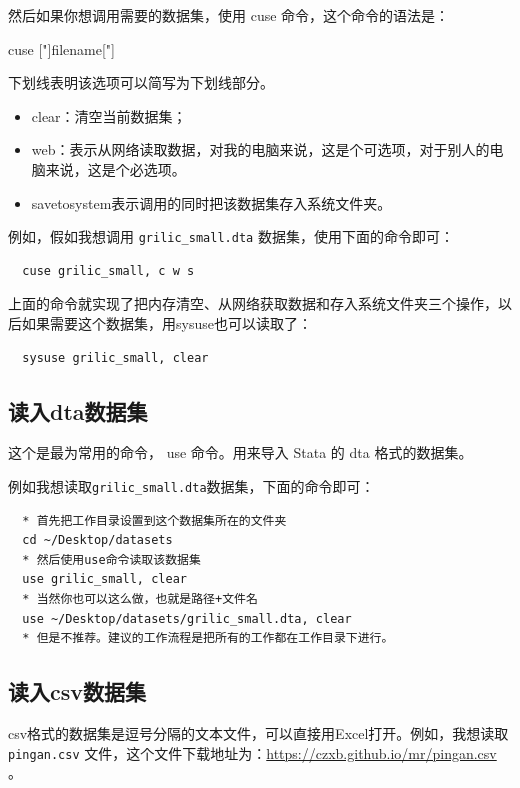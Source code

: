 \documentclass[cn,fancy,blue,11pt]{elegantbook}
\begin{document}
然后如果你想调用需要的数据集，使用 cuse 命令，这个命令的语法是：

\begin{stsyntax}
  \centering
  cuse
  ["]filename["]\
\end{stsyntax}

下划线表明该选项可以简写为下划线部分。

\begin{itemize}
  \item  clear：清空当前数据集；
  \item  web：表示从网络读取数据，对我的电脑来说，这是个可选项，对于别人的电脑来说，这是个必选项。
  \item  savetosystem表示调用的同时把该数据集存入系统文件夹。
\end{itemize}

例如，假如我想调用 \texttt{grilic\_small.dta} 数据集，使用下面的命令即可：

\begin{lstlisting}
  cuse grilic_small, c w s
\end{lstlisting}

上面的命令就实现了把内存清空、从网络获取数据和存入系统文件夹三个操作，以后如果需要这个数据集，用sysuse也可以读取了：

\begin{lstlisting}
  sysuse grilic_small, clear
\end{lstlisting}

\subsection{读入dta数据集}
这个是最为常用的命令， use 命令。用来导入 Stata 的 dta 格式的数据集。

例如我想读取\texttt{grilic\_small.dta}数据集，下面的命令即可：

\begin{lstlisting}
  * 首先把工作目录设置到这个数据集所在的文件夹
  cd ~/Desktop/datasets
  * 然后使用use命令读取该数据集
  use grilic_small, clear
  * 当然你也可以这么做，也就是路径+文件名
  use ~/Desktop/datasets/grilic_small.dta, clear
  * 但是不推荐。建议的工作流程是把所有的工作都在工作目录下进行。
\end{lstlisting}

\subsection{读入csv数据集}
csv格式的数据集是逗号分隔的文本文件，可以直接用Excel打开。例如，我想读取 \texttt{pingan.csv} 文件，这个文件下载地址为：\url{https://czxb.github.io/mr/pingan.csv} 。
\end{document}
